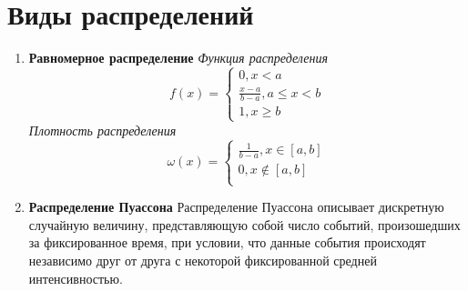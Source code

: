 \documentclass[14pt,a4paper]{article}
\begin{document}
\section{Виды распределений}
\begin{enumerate}
    \item \textbf{Равномерное распределение}
    \textit{Функция распределения}
    \begin{equation}
        f(x) = \begin{cases}
            0, x < a \\
            \frac{x-a}{b-a}, a \leqslant  x < b \\
            1, x \geqslant  b
        \end{cases}
    \end{equation}
    \textit{Плотность распределения}
    \begin{equation}
        \omega(x) = \begin{cases}
            \frac{1}{b-a}, x \in [a,b] \\
            0, x \notin [a,b]\\
        \end{cases}
    \end{equation}
    \item \textbf{Распределение Пуассона}
    Распределение Пуассона описывает дискретную случайную величину, представляющую собой число событий, произошедших за фиксированное время, при условии, что данные события происходят независимо друг от друга с некоторой фиксированной средней интенсивностью. 


\end{enumerate}
\end{document}
